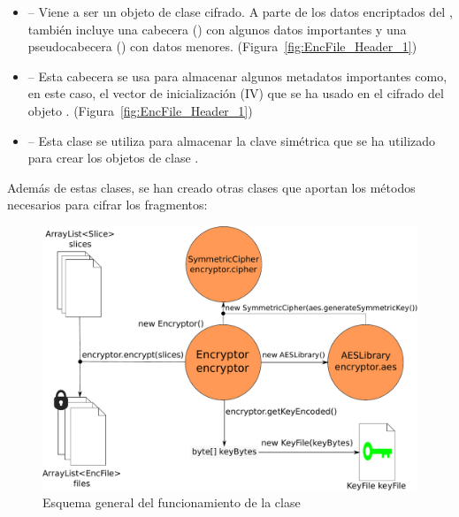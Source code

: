 \begin{itemize}
  \item {} -- Viene a ser un objeto de clase  cifrado. A parte de los datos encriptados del , también incluye una cabecera () con algunos datos importantes y una pseudocabecera () con datos menores. (Figura~\ref{fig:EncFile_Header_1})

  \item {} -- Esta cabecera se usa para almacenar algunos metadatos importantes como, en este caso, el vector de inicialización (IV) que se ha usado en el cifrado del objeto . (Figura~\ref{fig:EncFile_Header_1})

  \item {} -- Esta clase se utiliza para almacenar la clave simétrica que se ha utilizado para crear los objetos de clase .
\end{itemize}

Además de estas clases, se han creado otras clases que aportan los métodos necesarios para cifrar los fragmentos:

\begin{figure}[!htb]
  \centering
  \includegraphics[scale=0.5]{Figures/Encryptor}
  \decoRule
  \caption[]{Esquema general del funcionamiento de la clase }
  \label{fig:Encryptor}
\end{figure}

